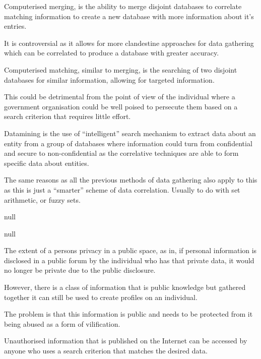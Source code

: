 Computerised merging, is the ability to merge disjoint databases to correlate matching information to create a new database with more information about it's entries.

It is controversial as it allows for more clandestine approaches for data gathering which can be correlated to produce a database with greater accuracy.


Computerised matching, similar to merging, is the searching of two disjoint databases for similar information, allowing for targeted information.

This could be detrimental from the point of view of the individual where a government organisation could be well poised to persecute them based on a search criterion that requires little effort.


Datamining is the use of ``intelligent'' search mechanism to extract data about an entity from a group of databases where information could turn from confidential and secure to non-confidential as the correlative techniques are able to form specific data about entities.

The same reasons as all the previous methods of data gathering also apply to this as this is just a ``smarter'' scheme of data correlation. Usually to do with set arithmetic, or fuzzy sets.


null


null




The extent of a persons privacy in a public space, as in, if personal information is disclosed in a public forum by the individual who has that private data, it would no longer be private due to the public disclosure.

However, there is a class of information that is public knowledge but gathered together it can still be used to create profiles on an individual.

The problem is that this information is public and needs to be protected from it being abused as a form of vilification.


Unauthorised information that is published on the Internet can be accessed by anyone who uses a search criterion that matches the desired data.

